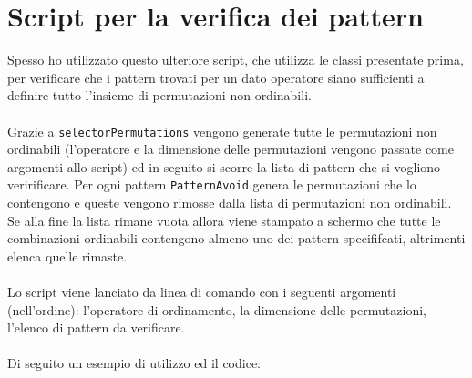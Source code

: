 \section*{Script per la verifica dei pattern}
Spesso ho utilizzato questo ulteriore script, che utilizza le classi presentate prima, per verificare che i pattern trovati per un dato operatore siano sufficienti a definire tutto l'insieme di permutazioni non ordinabili.\\\\
Grazie a \texttt{selectorPermutations} vengono generate tutte le permutazioni non ordinabili (l'operatore e la dimensione delle permutazioni vengono passate come argomenti allo script) ed in seguito si scorre la lista di pattern che si vogliono veririficare. Per ogni pattern \texttt{PatternAvoid} genera le permutazioni che lo contengono e queste vengono rimosse dalla lista di permutazioni non ordinabili. Se alla fine la lista rimane vuota allora viene stampato a schermo che tutte le combinazioni ordinabili contengono almeno uno dei pattern specififcati, altrimenti elenca quelle rimaste.\\\\
Lo script viene lanciato da linea di comando con i seguenti argomenti (nell'ordine): l'operatore di ordinamento, la dimensione delle permutazioni, l'elenco di pattern da verificare.\\\\
Di seguito un esempio di utilizzo ed il codice:\\


